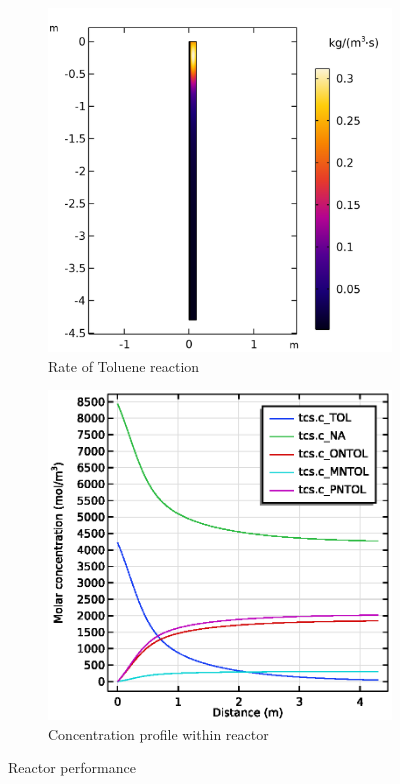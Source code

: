 \begin{figure}[h]
    \centering

    \begin{subfigure}{0.45\linewidth}
        \includegraphics[width=\linewidth, scale=0.5]{figures/r_TOL.png}
        \caption{Rate of Toluene reaction}
        \label{fig:comsol-performance:r_TOL}
    \end{subfigure}\hfill
    \begin{subfigure}{0.45\linewidth}
        \includegraphics[width=\linewidth, scale=0.5]{figures/concentration.eps}
        \caption{Concentration profile within reactor}
        \label{fig:comsol-performance:concentration}
    \end{subfigure}

    \caption{Reactor performance}
    \label{fig:comsol-performance}
\end{figure}


